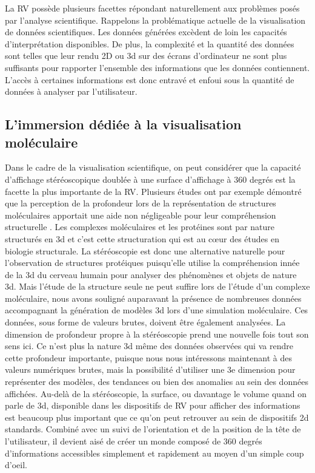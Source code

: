La RV possède plusieurs facettes répondant naturellement aux problèmes posés par l'analyse scientifique. Rappelons la problématique actuelle de la visualisation de données scientifiques. Les données générées excèdent de loin les capacités d'interprétation disponibles. De plus, la complexité et la quantité des données sont telles que leur rendu 2D ou 3d sur des écrans d'ordinateur ne sont plus suffisants pour rapporter l'ensemble des informations que les données contiennent. L'accès à certaines informations est donc entravé et enfoui sous la quantité de données à analyser par l'utilisateur.

\subsection{L'immersion dédiée à la visualisation moléculaire}

Dans le cadre de la visualisation scientifique, on peut considérer que la capacité d'affichage stéréoscopique doublée à une surface d'affichage à 360 degrés est la facette la plus importante de la RV. Plusieurs études ont par exemple démontré que la perception de la profondeur lors de la représentation de structures moléculaires apportait une aide non négligeable pour leur compréhension structurelle \cite{van_dam_immersive_2000,stone_immersive_2010,odonoghue_visualization_2010}. Les complexes moléculaires et les protéines sont par nature structurés en 3d et c'est cette structuration qui est au cœur des études en biologie structurale. La stéréoscopie est donc une alternative naturelle pour l'observation de structures protéiques puisqu'elle utilise la compréhension innée de la 3d du cerveau humain pour analyser des phénomènes et objets de nature 3d. 
Mais l'étude de la structure seule ne peut suffire lors de l'étude d'un complexe moléculaire, nous avons souligné auparavant la présence de nombreuses données accompagnant la génération de modèles 3d lors d'une simulation moléculaire. Ces données, sous forme de valeurs brutes, doivent être également analysées. La dimension de profondeur propre à la stéréoscopie prend une nouvelle fois tout son sens ici. Ce n'est plus la nature 3d même des données observées qui va rendre cette profondeur importante, puisque nous nous intéressons maintenant à des valeurs numériques brutes, mais la possibilité d'utiliser une 3e dimension pour représenter des modèles, des tendances ou bien des anomalies au sein des données affichées.
Au-delà de la stéréoscopie, la surface, ou davantage le volume quand on parle de 3d, disponible dans les dispositifs de RV pour afficher des informations est beaucoup plus important que ce qu'on peut retrouver au sein de dispositifs 2d standards. Combiné avec un suivi de l'orientation et de la position de la tête de l'utilisateur, il devient aisé de créer un monde composé de 360 degrés d'informations accessibles simplement et rapidement au moyen d'un simple coup d'oeil.


